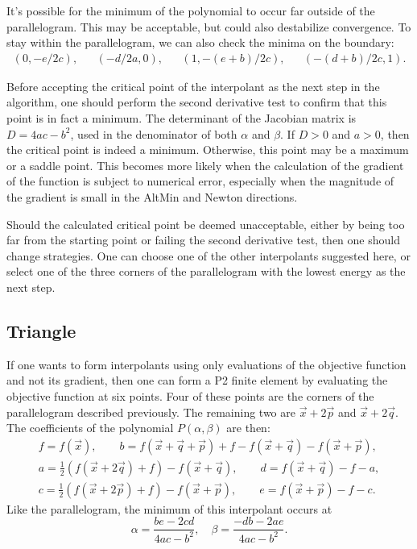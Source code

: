 \documentclass{article}
\numberwithin{equation}{section}
\begin{document}
It's possible for the minimum of the polynomial to occur far outside of the parallelogram.
This may be acceptable, but could also destabilize convergence.
To stay within the parallelogram, we can also check the minima on the boundary:
\begin{align*}
	(0, -e/2c), && (-d/2a, 0), && (1, -(e+b)/2c), && (-(d+b)/2c, 1).
\end{align*}


Before accepting the critical point of the interpolant as the next step in the algorithm, one should perform the second derivative test to confirm that this point is in fact a minimum.
The determinant of the Jacobian matrix is $D = 4ac - b^2$, used in the denominator of both $\alpha$ and $\beta$.
If $D>0$ and $a>0$, then the critical point is indeed a minimum.
Otherwise, this point may be a maximum or a saddle point.
This becomes more likely when the calculation of the gradient of the function is subject to numerical error, especially when the magnitude of the gradient is small in the AltMin and Newton directions.

Should the calculated critical point be deemed unacceptable, either by being too far from the starting point or failing the second derivative test, then one should change strategies.
One can choose one of the other interpolants suggested here, or select one of the three corners of the parallelogram with the lowest energy as the next step.

\subsection{Triangle}
\label{subsec: tri}

If one wants to form interpolants using only evaluations of the objective function and not its gradient, then one can form a P2 finite element by evaluating the objective function at six points.
Four of these points are the corners of the parallelogram described previously.
The remaining two are $\vec{x} + 2 \vec{p}$ and $\vec{x} + 2 \vec{q}$.
The coefficients of the polynomial $P(\alpha, \beta)$ are then:
\begin{align*}
	f = f(\vec{x}), \qquad
	b = f(\vec{x} + \vec{q} + \vec{p}) + f - f(\vec{x} + \vec{q}) - f(\vec{x} + \vec{p}), \\
	a = \frac{1}{2} \left ( f(\vec{x} + 2 \vec{q}) + f \right ) - f(\vec{x} + \vec{q}), \qquad
	d = f(\vec{x} + \vec{q}) - f - a, \\
	c = \frac{1}{2} \left ( f(\vec{x} + 2 \vec{p}) + f \right ) - f(\vec{x} + \vec{p}), \qquad
	e = f(\vec{x} + \vec{p}) - f - c.
\end{align*}
Like the parallelogram, the minimum of this interpolant occurs at
\begin{equation*}
	\alpha = \frac{be - 2cd}{4ac-b^2}, \quad \beta = \frac{-db - 2ae}{4ac-b^2}.
\end{equation*}
\end{document}
